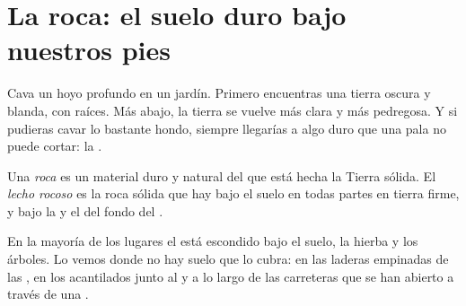 \section{La roca: el suelo duro bajo nuestros pies}

Cava un hoyo profundo en un jardín. Primero encuentras una tierra oscura y
blanda, con raíces. Más abajo, la tierra se vuelve más clara y más
pedregosa. Y si pudieras cavar lo bastante hondo, siempre llegarías a algo
duro que una pala no puede cortar: la .

\begin{definition}\label{def:g3:stones-pebbles-sand:rock}
Una \emph{roca} es un material duro y natural del que está hecha
la Tierra sólida. El \emph{lecho rocoso} es la roca
sólida que hay bajo el suelo en todas partes en tierra firme, y bajo la
 y el  del fondo del .
\end{definition}

En la mayoría de los lugares el  está escondido bajo el suelo,
la hierba y los árboles. Lo vemos donde no hay suelo que lo cubra: en las
laderas empinadas de las , en los acantilados junto al  y a lo
largo de las carreteras que se han abierto a través de una .

